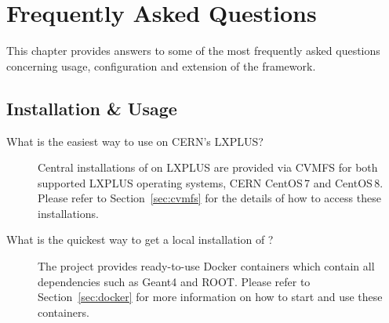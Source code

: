 \chapter{Frequently Asked Questions}
\label{ch:faq}

This chapter provides answers to some of the most frequently asked questions concerning usage, configuration and extension of the \apsq framework.

\section{Installation \& Usage}

\begin{description}
\item[What is the easiest way to use \apsq on CERN's LXPLUS?]
Central installations of \apsq on LXPLUS are provided via CVMFS for both supported LXPLUS operating systems, CERN CentOS\,7 and CentOS\,8. Please refer to Section~\ref{sec:cvmfs} for the details of how to access these installations.
\item[What is the quickest way to get a local installation of \apsq?]
The project provides ready-to-use Docker containers which contain all dependencies such as Geant4 and ROOT. Please refer to Section~\ref{sec:docker} for more information on how to start and use these containers.
\end{description}

